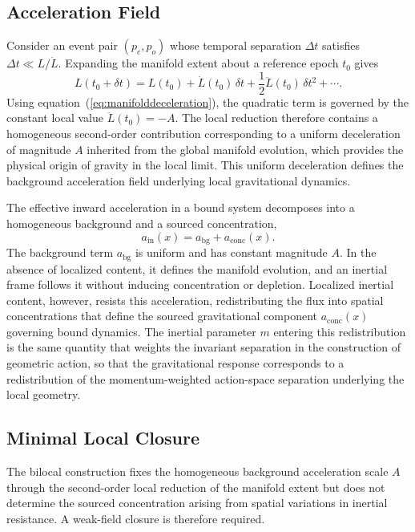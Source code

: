 \documentclass[fontsize=12pt, paper=a4]{scrartcl}
\begin{document}
\subsection{Acceleration Field}

Consider an event pair $(p_e,p_o)$ whose temporal separation $\Delta t$ satisfies $\Delta t \ll L/\dot L$. Expanding the manifold extent about a reference epoch $t_0$ gives
\begin{equation}
L(t_0+\delta t)=L(t_0)+\dot{L}(t_0)\,\delta t+\frac{1}{2}\ddot{L}(t_0)\,\delta t^2+\cdots .
\end{equation}
Using equation~(\ref{eq:manifolddeceleration}), the quadratic term is governed by the constant local value $\ddot{L}(t_0)=-A$. The local reduction therefore contains a homogeneous second-order contribution corresponding to a uniform deceleration of magnitude $A$ inherited from the global manifold evolution, which provides the physical origin of gravity in the local limit. This uniform deceleration defines the background acceleration field underlying local gravitational dynamics.

The effective inward acceleration in a bound system decomposes into a homogeneous background and a sourced concentration,
\begin{equation}
a_{\mathrm{in}}(x)=a_{\mathrm{bg}}+a_{\mathrm{conc}}(x).
\label{eq:ain_scalar}
\end{equation}
The background term $a_{\mathrm{bg}}$ is uniform and has constant magnitude $A$. In the absence of localized content, it defines the manifold evolution, and an inertial frame follows it without inducing concentration or depletion. Localized inertial content, however, resists this acceleration, redistributing the flux into spatial concentrations that define the sourced gravitational component $a_{\mathrm{conc}}(x)$ governing bound dynamics. The inertial parameter $m$ entering this redistribution is the same quantity that weights the invariant separation in the construction of geometric action, so that the gravitational response corresponds to a redistribution of the momentum-weighted action-space separation underlying the local geometry.

\subsection{Minimal Local Closure}

The bilocal construction fixes the homogeneous background acceleration scale $A$ through the second-order local reduction of the manifold extent but does not determine the sourced concentration arising from spatial variations in inertial resistance. A weak-field closure is therefore required.
\end{document}
